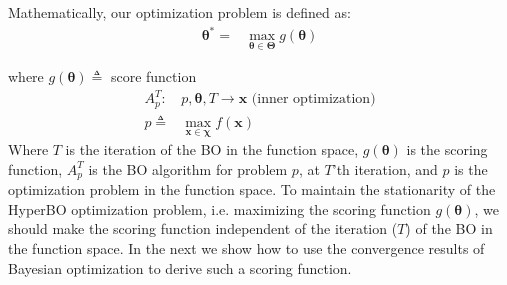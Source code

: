 \documentclass{article}
\begin{document}
Mathematically, our optimization problem is defined as:
\begin{align*}
\boldsymbol{\theta}^{*} = & \operatorname*{max}_{\boldsymbol{\theta}\in \boldsymbol{\Theta}} g(\boldsymbol{\theta})
\end{align*}

where $g(\boldsymbol{\theta}) \triangleq$ score function
\begin{align*}
A_{p}^{T} : & p, \boldsymbol{\theta}, T \rightarrow \boldsymbol{x} \text{ (inner optimization)}\\
p \triangleq & \operatorname*{max}_{\boldsymbol{x}\in \boldsymbol{\chi}} f(\boldsymbol{x})
\end{align*}
Where $T$ is the iteration of the BO in the function space, $g(\boldsymbol{\theta})$ is the scoring function, $A_{p}^{T}$ is the BO algorithm for problem $p$, at $T$'th iteration, and $p$ is the optimization problem in the function space. To maintain the stationarity of the HyperBO optimization problem, i.e. maximizing the scoring function $g(\boldsymbol{\theta})$, we should make the scoring function independent of the iteration ($T$) of the BO in the function space. In the next we show how to use the convergence results of Bayesian optimization to derive such a scoring function.
\end{document}

